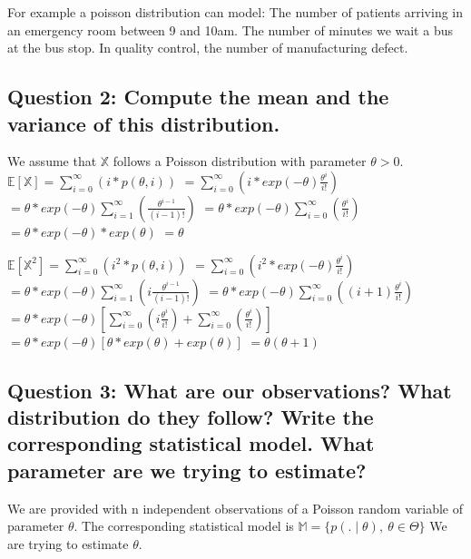 \documentclass[]{article}
\begin{document}
For example a poisson distribution can model: The number of patients
arriving in an emergency room between 9 and 10am. The number of minutes
we wait a bus at the bus stop. In quality control, the number of
manufacturing defect.

\hypertarget{question-2-compute-the-mean-and-the-variance-of-this-distribution.}{%
\subsection{Question 2: Compute the mean and the variance of this
distribution.}\label{question-2-compute-the-mean-and-the-variance-of-this-distribution.}}

We assume that \(\mathbb{X}\) follows a Poisson distribution with
parameter \(\theta > 0\).
\(\mathbb{E}[\mathbb{X}] = \sum_{i=0}^{\infty} (i * p(\theta, i))\)
\(= \sum_{i=0}^{\infty} (i*exp(-\theta) \frac{\theta^{i}}{i!})\)
\(= \theta * exp(-\theta)\sum_{i=1}^{\infty} (\frac{\theta^{i-1}}{(i-1)!})\)
\(= \theta * exp(-\theta)\sum_{i=0}^{\infty} (\frac{\theta^{i}}{i!})\)
\(= \theta * exp(-\theta) * exp(\theta)\) \(= \theta\)

\(\mathbb{E}[\mathbb{X}^2] = \sum_{i=0}^{\infty} (i^2 * p(\theta, i))\)
\(= \sum_{i=0}^{\infty} (i^2*exp(-\theta) \frac{\theta^{i}}{i!})\)
\(= \theta * exp(-\theta)\sum_{i=1}^{\infty} (i\frac{\theta^{i-1}}{(i-1)!})\)
\(= \theta * exp(-\theta)\sum_{i=0}^{\infty} ((i+1)\frac{\theta^{i}}{i!})\)
\(= \theta * exp(-\theta)[\sum_{i=0}^{\infty} (i\frac{\theta^{i}}{i!}) + \sum_{i=0}^{\infty} (\frac{\theta^{i}}{i!})]\)
\(= \theta * exp(-\theta)[\theta * exp(\theta) + exp(\theta)]\)
\(= \theta (\theta + 1)\)

\hypertarget{question-3-what-are-our-observations-what-distribution-do-they-follow-write-the-corresponding-statistical-model.-what-parameter-are-we-trying-to-estimate}{%
\subsection{Question 3: What are our observations? What distribution do
they follow? Write the corresponding statistical model. What parameter
are we trying to
estimate?}\label{question-3-what-are-our-observations-what-distribution-do-they-follow-write-the-corresponding-statistical-model.-what-parameter-are-we-trying-to-estimate}}

We are provided with n independent observations of a Poisson random
variable of parameter \(\theta\). The corresponding statistical model is
\(\mathbb{M} = \{p(.\mid \theta),\ \theta \in\Theta \}\) We are trying
to estimate \(\theta\).
\end{document}
